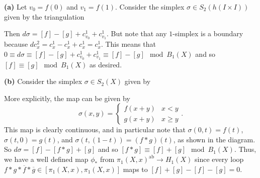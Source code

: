\documentclass[11pt,letterpaper]{article}
\begin{document}
\begin{solution}
    \textbf{(a)} Let $v_0=f(0)$ and $v_1=f(1)$. Consider the simplex $\sigma \in S_2(h(I\times I))$ given by the triangulation
    \begin{center}
    \end{center}

    Then $d\sigma = [f] - [g] + c_{v_0}^1 + c_{v_1}^1$. But note that any $1$-simplex is a boundary because $d c_x^2 = c_x^1 - c_x^1 + c_x^1 = c_x^1$. This means that $0\equiv d\sigma \equiv [f]-[g]+c_{v_0}^1+c_{v_1}^1\equiv [f]-[g]\mod B_1(X)$ and so $[f]\equiv [g]\mod B_1(X)$ as desired.

    \textbf{(b)} Consider the simplex $\sigma \in S_2(X)$ given by
    \begin{center}
    \end{center}
    More explicitly, the map can be given by
    \[
        \sigma(x,y) = \begin{cases}
            f(x+y) & x < y\\
            g(x+y) & x \geq y
        \end{cases}
    .\] 
    This map is clearly continuous, and in particular note that $\sigma(0,t)=f(t)$, $\sigma(t,0)=g(t)$, and $\sigma(t, (1-t))=(f*g)(t)$, as shown in the diagram. So $d\sigma = [f]-[f*g]+[g]$ and so $[f*g]\equiv [f]+[g]\mod B_1(X)$. Thus, we have a well defined map $\phi_*$ from $\pi_1(X,x)^\text{ab} \to H_1(X)$ since every loop $f*g*\overline{f}*\overline{g}\in [\pi_1(X,x), \pi_1(X,x)]$ maps to $[f]+[g]-[f]-[g]=0$.  


\end{solution}
\end{document}
